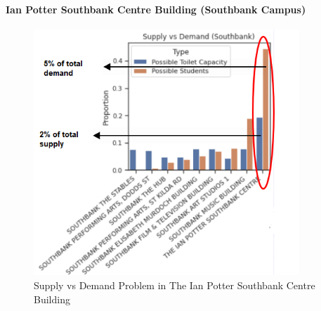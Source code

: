 \paragraph{Ian Potter Southbank Centre Building (Southbank Campus)}
\begin{figure}[H]
\centering
\includegraphics[width=10cm,keepaspectratio=true]{resources/images/spatial-tr/ian.PNG}
\caption{Supply vs Demand Problem in The Ian Potter Southbank Centre Building}
\label{fig:ian}
\end{figure}

